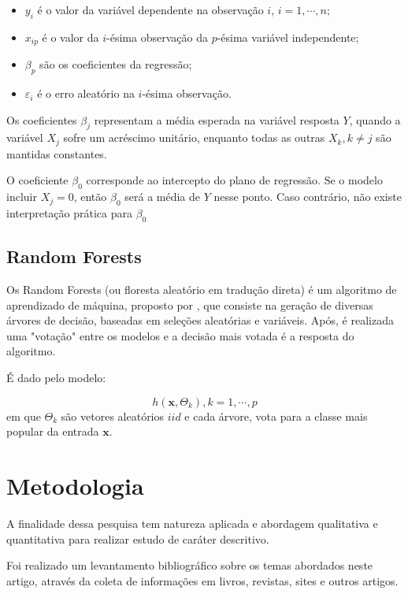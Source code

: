 \documentclass[12pt]{article}
\begin{document}
\begin{itemize}
  \item $y_i$ é o valor da variável dependente na observação $i$, $i = 1, \cdots, n$;
  \item $x_{ip}$ é o valor da $i$-ésima observação da $p$-ésima variável independente;
  \item $\beta_p$ são os coeficientes da regressão;
  \item $\varepsilon_i$ é o erro aleatório na $i$-ésima observação.
\end{itemize}

Os coeficientes $\beta_j$ representam a média esperada na 
variável resposta $Y$, quando a variável $X_j$ sofre um acréscimo unitário, 
enquanto todas as outras $X_k, k \neq j$ são mantidas constantes.

O coeficiente $\beta_0$ corresponde ao intercepto do plano de regressão. Se o 
modelo incluir $X_j = 0$, então $\beta_0$ será a média de $Y$ nesse ponto.
Caso contrário, não existe interpretação prática para $\beta_0$


\subsection{Random Forests}

Os Random Forests (ou floresta aleatório em tradução direta) é um algoritmo de 
aprendizado de máquina, proposto por \cite{breiman2001random}, que consiste na
geração de diversas árvores de decisão, baseadas em seleções aleatórias e 
variáveis. Após, é realizada uma "votação" entre os modelos e a decisão mais 
votada é a resposta do algoritmo.

É dado pelo modelo:

\begin{equation}
  h(\mathbf{x},\Theta_k), k = 1, \cdots, p
\end{equation}
em que $\Theta_k$ são vetores aleatórios $iid$ e cada árvore, vota para a classe
mais popular da entrada $\mathbf{x}$.


\section{Metodologia} \label{sec:firstpage}

A finalidade dessa pesquisa tem natureza aplicada e abordagem qualitativa e 
quantitativa para realizar estudo de caráter descritivo.

Foi realizado um levantamento bibliográfico sobre os temas abordados neste 
artigo, através da coleta de informações em livros, revistas, sites e outros 
artigos.
\end{document}
